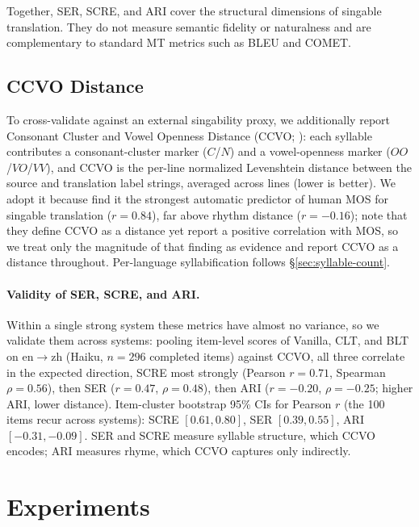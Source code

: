 \documentclass[11pt]{article}
\begin{document}
Together, SER, SCRE, and ARI cover the structural dimensions of singable translation.
They do not measure semantic fidelity or naturalness and are complementary to standard MT metrics such as BLEU and COMET.

\subsection{CCVO Distance}
\label{sec:ccvo}

To cross-validate against an external singability proxy, we additionally report Consonant Cluster and Vowel Openness Distance (CCVO; \citealp{stepankova-rosa-2025}): each syllable contributes a consonant-cluster marker ($C$/$N$) and a vowel-openness marker ($OO$/$VO$/$VV$), and CCVO is the per-line normalized Levenshtein distance between the source and translation label strings, averaged across lines (lower is better).
We adopt it because \citet{liu-etal-2026-towards} find it the strongest automatic predictor of human MOS for singable translation ($r{=}0.84$), far above rhythm distance ($r{=}{-}0.16$); note that they define CCVO as a distance yet report a positive correlation with MOS, so we treat only the magnitude of that finding as evidence and report CCVO as a distance throughout.
Per-language syllabification follows \S\ref{sec:syllable-count}.

\paragraph{Validity of SER, SCRE, and ARI.}
Within a single strong system these metrics have almost no variance, so we validate them across systems: pooling item-level scores of Vanilla, CLT, and BLT on en$\rightarrow$zh (Haiku, $n{=}296$ completed items) against CCVO, all three correlate in the expected direction, SCRE most strongly (Pearson $r{=}0.71$, Spearman $\rho{=}0.56$), then SER ($r{=}0.47$, $\rho{=}0.48$), then ARI ($r{=}{-}0.20$, $\rho{=}{-}0.25$; higher ARI, lower distance).
Item-cluster bootstrap 95\% CIs for Pearson $r$ (the 100 items recur across systems): SCRE $[0.61, 0.80]$, SER $[0.39, 0.55]$, ARI $[-0.31, -0.09]$.
SER and SCRE measure syllable structure, which CCVO encodes; ARI measures rhyme, which CCVO captures only indirectly.

\section{Experiments}
\label{sec:experiments}
\end{document}
